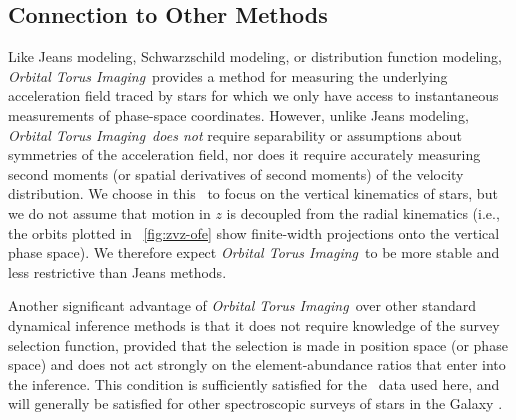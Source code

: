 \documentclass[modern]{aastex63}
\newcommand{\methodname}{\textsl{Orbital Torus Imaging}}
\newcommand{\apogee}{\acronym{APOGEE}}
\begin{document}
\subsection{Connection to Other Methods}


Like Jeans modeling, Schwarzschild modeling, or distribution function modeling,
\methodname\ provides a method for measuring the underlying acceleration field
traced by stars for which we only have access to instantaneous measurements of
phase-space coordinates.
However, unlike Jeans modeling, \methodname\ \emph{does not} require
separability or assumptions about symmetries of the acceleration field, nor does
it require accurately measuring second moments (or spatial derivatives of second
moments) of the velocity distribution.
We choose in this \documentname\ to focus on the vertical kinematics of stars,
but we do not assume that motion in $z$ is decoupled from the radial kinematics
(i.e., the orbits plotted in \figurename~\ref{fig:zvz-ofe} show finite-width
projections onto the vertical phase space).
We therefore expect \methodname\ to be more stable and less restrictive than
Jeans methods.

Another significant advantage of \methodname\ over other standard dynamical
inference methods is that it does not require knowledge of the survey selection
function, provided that the selection is made in position space (or phase space)
and does not act strongly on the element-abundance ratios that enter into the
inference.
This condition is sufficiently satisfied for the \apogee\ data used here, and
will generally be satisfied for other spectroscopic surveys of stars in the
Galaxy \citep[e.g., ;][]{Martell:2017, Buder:2018}.
\end{document}
